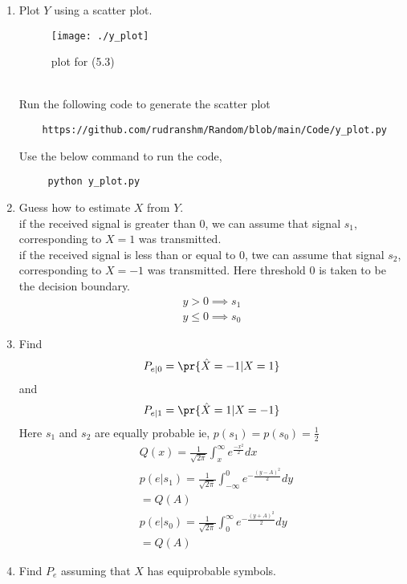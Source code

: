\documentclass[journal,12pt,twocolumn]{IEEEtran}
\begin{document}
\begin{enumerate}[label=\thesection.\arabic*
,ref=\thesection.\theenumi]
\item Plot $Y$ using a scatter plot.\\
	\solution
	\begin{figure}[h]
\texttt{[image: ./y\_plot]}
\caption{plot for (5.3)}
\label{fig:Y_Plot}
\end{figure}
\\
	Run the following code to generate the scatter plot
	\begin{lstlisting}
	https://github.com/rudranshm/Random/blob/main/Code/y_plot.py
	\end{lstlisting}
	Use the below command to run the code,
	\begin{lstlisting}
     python y_plot.py 
	\end{lstlisting}
\item Guess how to estimate $X$ from $Y$.\\
	\solution
	if the received signal is greater than 0, we can assume that signal $s_1$, corresponding to $X=1$ was transmitted.\\
if the received signal is less than or equal to 0, twe can assume that signal $s_2$, corresponding to $X=-1$ was transmitted. Here threshold 0 is taken to be the decision boundary.
\begin{align}
y>0 \implies s_1\\
y\leq 0 \implies s_0
\end{align}
\item
\label{ml-ch4_sim}
Find 
\begin{equation}
	P_{e|0} = \pr{\hat{X} = -1|X=1}
\end{equation}
and 
\begin{equation}
	P_{e|1} = \pr{\hat{X} = 1|X=-1}
\end{equation}
\solution 
Here $s_1$ and $s_2$ are equally probable ie, $p(s_1)=p(s_0)=\frac{1}{2}$ \\
\begin{align}
&Q(x)=\frac{1}{\sqrt{2\pi}} \int_{x}^{\infty} e^{\frac{-x^{2}}{2} } dx\\
&p(e|s_1)=\frac{1}{\sqrt{2 \pi}} \int_{-\infty}^{0} e^{-\frac{(y-A)^2}{2}} dy
\nonumber \\
&=Q(A)\\
&p(e|s_0)=\frac{1}{\sqrt{2 \pi}} \int_{0}^{\infty} e^{-\frac{(y+A)^{2}}{2}} dy
\nonumber \\
&=Q(A)
\end{align}
%
\item Find $P_e$ assuming that $X$ has equiprobable symbols.\\

\end{enumerate}
\end{document}
